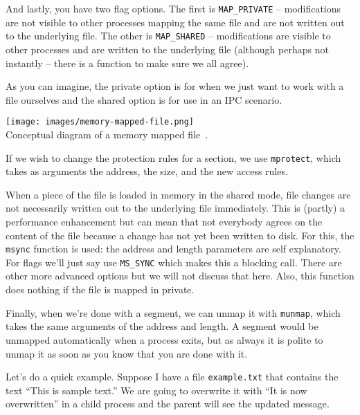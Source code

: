 And lastly, you have two flag options. The first is \texttt{MAP\_PRIVATE} -- modifications are not visible to other processes mapping the same file and are not written out to the underlying file. The other is \texttt{MAP\_SHARED} -- modifications are visible to other processes and are written to the underlying file (although perhaps not instantly -- there is a function to make sure we all agree).

As you can imagine, the private option is for when we just want to work with a file ourselves and the shared option is for use in an IPC scenario.

\begin{center}
	\texttt{[image: images/memory-mapped-file.png]}\\
	Conceptual diagram of a memory mapped file~\cite{apunix}.
\end{center}

If we wish to change the protection rules for a section, we use \texttt{mprotect}, which takes as arguments the address, the size, and the new access rules.

When a piece of the file is loaded in memory in the shared mode, file changes are not necessarily written out to the underlying file immediately. This is (partly) a performance enhancement but can mean that not everybody agrees on the content of the file because a change has not yet been written to disk. For this, the \texttt{msync} function is used: the address and length parameters are self explanatory. For flags we'll just say use \texttt{MS\_SYNC} which makes this a blocking call. There are other more advanced options but we will not discuss that here. Also, this function does nothing if the file is mapped in private.

Finally, when we're done with a segment, we can unmap it with \texttt{munmap}, which takes the same arguments of the address and length. A segment would be unmapped automatically when a process exits, but as always it is polite to unmap it as soon as you know that you are done with it.

Let's do a quick example. Suppose I have a file \texttt{example.txt} that contains the text ``This is sample text.'' We are going to overwrite it with ``It is now overwritten'' in a child process and the parent will see the updated message.

